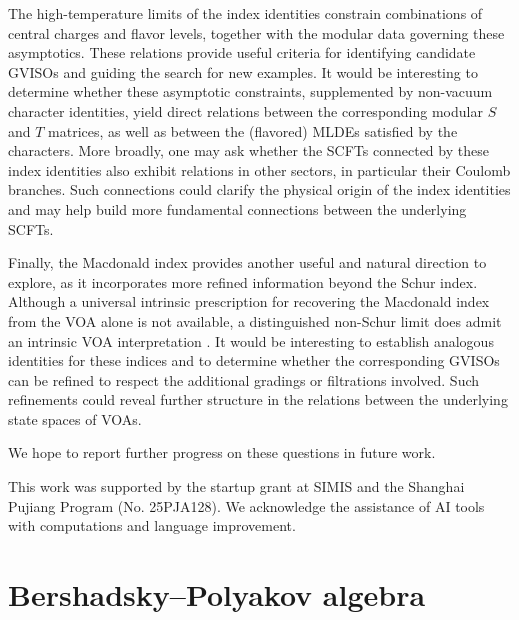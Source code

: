\documentclass[a4paper,11pt]{article}
\theoremstyle{definition}
\theoremstyle{definition}
\theoremstyle{remark}
\begin{document}
The high-temperature limits of the index identities constrain combinations of central charges and flavor levels, together with the modular data governing these asymptotics. These relations provide useful criteria for identifying candidate GVISOs and guiding the search for new examples. It would be interesting to determine whether these asymptotic constraints, supplemented by non-vacuum character identities, yield direct relations between the corresponding modular $S$ and $T$ matrices, as well as between the (flavored) MLDEs satisfied by the characters. More broadly, one may ask whether the SCFTs connected by these index identities also exhibit relations in other sectors, in particular their Coulomb branches. Such connections could clarify the physical origin of the index identities and
may help build more fundamental connections   between the underlying SCFTs.

Finally, the Macdonald index     provides another useful and  natural direction to explore, as it incorporates more refined  information beyond  the Schur index. Although a universal intrinsic prescription for recovering the Macdonald index from the VOA alone is not available, a distinguished non-Schur limit does admit an intrinsic VOA interpretation \cite{Jiang:2026ffv}. It would be interesting to establish analogous identities for these indices and to determine whether the corresponding GVISOs can be refined to respect the additional gradings or filtrations involved. Such refinements could reveal further structure in the relations between the underlying state spaces of VOAs.

We hope to report further progress on these questions    in   future work.


  
\acknowledgments
   This work was supported by the startup grant at SIMIS and the Shanghai Pujiang Program (No. 25PJA128).
We acknowledge the assistance of AI tools with computations and language improvement.
   
\appendix

\section{Bershadsky--Polyakov algebra}\label{BPalg}
\end{document}
